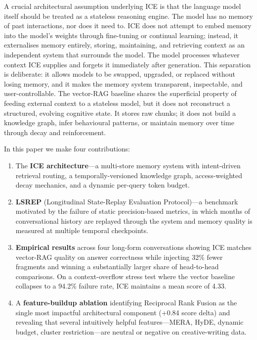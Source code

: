 \documentclass[10pt]{article}
\begin{document}
A crucial architectural assumption underlying ICE is that the language model itself should be treated as a stateless reasoning engine. The model has no memory of past interactions, nor does it need to. ICE does not attempt to embed memory into the model's weights through fine-tuning or continual learning; instead, it externalises memory entirely, storing, maintaining, and retrieving context as an independent system that surrounds the model. The model processes whatever context ICE supplies and forgets it immediately after generation. This separation is deliberate: it allows models to be swapped, upgraded, or replaced without losing memory, and it makes the memory system transparent, inspectable, and user-controllable. The vector-RAG baseline shares the superficial property of feeding external context to a stateless model, but it does not reconstruct a structured, evolving cognitive state. It stores raw chunks; it does not build a knowledge graph, infer behavioural patterns, or maintain memory over time through decay and reinforcement.

In this paper we make four contributions:

\begin{enumerate}[leftmargin=*]
  \item The \textbf{ICE architecture}---a multi-store memory system with intent-driven retrieval routing, a temporally-versioned knowledge graph, access-weighted decay mechanics, and a dynamic per-query token budget.
  \item \textbf{LSREP} (Longitudinal State-Replay Evaluation Protocol)---a benchmark motivated by the failure of static precision-based metrics, in which months of conversational history are replayed through the system and memory quality is measured at multiple temporal checkpoints.
  \item \textbf{Empirical results} across four long-form conversations showing ICE matches vector-RAG quality on answer correctness while injecting 32\% fewer fragments and winning a substantially larger share of head-to-head comparisons. On a context-overflow stress test where the vector baseline collapses to a 94.2\% failure rate, ICE maintains a mean score of 4.33.
  \item A \textbf{feature-buildup ablation} identifying Reciprocal Rank Fusion as the single most impactful architectural component (+0.84 score delta) and revealing that several intuitively helpful features---MERA, HyDE, dynamic budget, cluster restriction---are neutral or negative on creative-writing data.
\end{enumerate}
\end{document}

